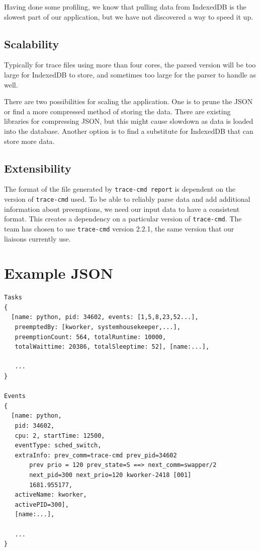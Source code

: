 \documentclass{hmcclinic}
\begin{document}
Having done some profiling, we know that pulling data from IndexedDB is the
slowest part of our application, but we have not discovered a way to speed it up.

\section{Scalability}
Typically for trace files using more than four
cores, the parsed version will be too large for IndexedDB to store, and
sometimes too large for the parser to handle as well.

There are two possibilities for scaling the application. One is to prune the JSON or
find a more compressed method of storing the data. There are existing libraries
for compressing JSON, but this might cause slowdown as data is
 loaded into the database.
Another option is to find a substitute for IndexedDB that can store more data.

\section{Extensibility}
  The format of the file generated by \texttt{trace-cmd
  report} is dependent on the version of \texttt{trace-cmd} used. To be able to reliably
  parse data and add additional information about preemptions, we need our input
  data to have a consistent format. This creates a dependency on a particular
  version of \texttt{trace-cmd}. The team has chosen to use \texttt{trace-cmd} version 2.2.1, 
  the same version that our liaisons currently use.

\newpage
\let\cleardoublepage\clearpage
\appendix
\renewcommand{\thechapter}{\Alph{chapter}}
\chapter{Example JSON} \label{App:AppendixA}

\begin{verbatim}
Tasks
{
  [name: python, pid: 34602, events: [1,5,8,23,52...], 
   preemptedBy: [kworker, systemhousekeeper,...], 
   preemptionCount: 564, totalRuntime: 10000,
   totalWaittime: 20386, totalSleeptime: 52], [name:...],

   ...   
}

Events
{
  [name: python, 
   pid: 34602, 
   cpu: 2, startTime: 12500, 
   eventType: sched_switch,
   extraInfo: prev_comm=trace-cmd prev_pid=34602 
       prev prio = 120 prev_state=S ==> next_comm=swapper/2 
       next_pid=300 next_prio=120 kworker-2418 [001]
       1681.955177, 
   activeName: kworker, 
   activePID=300], 
   [name:...], 

   ...
}
\end{verbatim}
\end{document}
